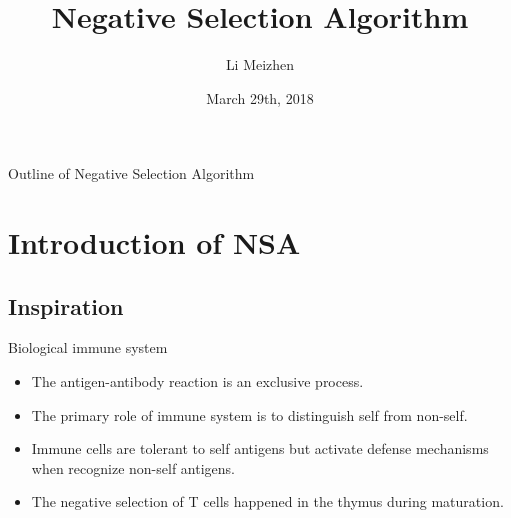 
\title{Negative Selection Algorithm}

\author{Li Meizhen}


\date{March 29th, 2018}


%

\begin{frame}
  \titlepage
  \end{frame}


\begin{frame}{Outline of Negative Selection Algorithm}
  \tableofcontents
\end{frame}

\section{Introduction of NSA}

\subsection{Inspiration}

\begin{frame}{Biological immune system}
  \begin{itemize}
  \item {
    The antigen-antibody reaction is an exclusive process.
  }
  \item {
    The primary role of immune system is to distinguish self from non-self.
  }
  \item {
    Immune cells are tolerant to self antigens but activate defense mechanisms when recognize non-self antigens.   
  }
  \item {
    The negative selection of T cells happened in the thymus during maturation.
  }
  \end{itemize}
\end{frame}

